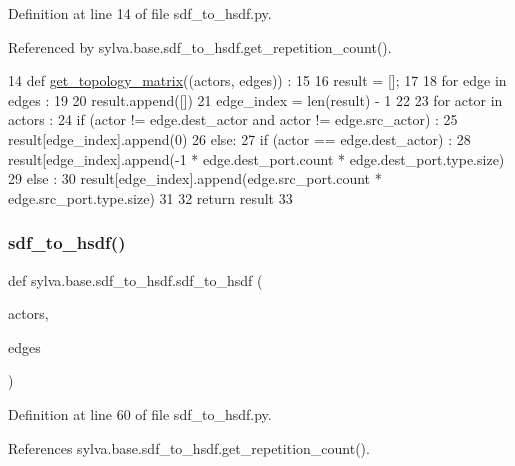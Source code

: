 Definition at line 14 of file sdf\+\_\+to\+\_\+hsdf.\+py.



Referenced by sylva.\+base.\+sdf\+\_\+to\+\_\+hsdf.\+get\+\_\+repetition\+\_\+count().


\begin{DoxyCode}
14 \textcolor{keyword}{def }\hyperlink{namespacesylva_1_1base_1_1sdf__to__hsdf_a947a1ab376b5ba3021f86fba7fcb17aa}{get\_topology\_matrix}((actors, edges)) :
15 
16   result = [];
17 
18   \textcolor{keywordflow}{for} edge \textcolor{keywordflow}{in} edges :
19 
20     result.append([])
21     edge\_index = len(result) - 1
22 
23     \textcolor{keywordflow}{for} actor \textcolor{keywordflow}{in} actors :
24       \textcolor{keywordflow}{if} (actor != edge.dest\_actor \textcolor{keywordflow}{and} actor != edge.src\_actor) :
25         result[edge\_index].append(0)
26       \textcolor{keywordflow}{else}:
27         \textcolor{keywordflow}{if} (actor == edge.dest\_actor) :
28           result[edge\_index].append(-1 * edge.dest\_port.count * edge.dest\_port.type.size)
29         \textcolor{keywordflow}{else} :
30           result[edge\_index].append(edge.src\_port.count * edge.src\_port.type.size)
31 
32   \textcolor{keywordflow}{return} result
33 
\end{DoxyCode}
\mbox{\label{namespacesylva_1_1base_1_1sdf__to__hsdf_a41dda1a461cf7b083fbd682fc94d5e10}} 
\subsubsection{\texorpdfstring{sdf\+\_\+to\+\_\+hsdf()}{sdf\_to\_hsdf()}}
{\footnotesize\ttfamily def sylva.\+base.\+sdf\+\_\+to\+\_\+hsdf.\+sdf\+\_\+to\+\_\+hsdf (\begin{DoxyParamCaption}\item[{}]{actors,  }\item[{}]{edges }\end{DoxyParamCaption})}



Definition at line 60 of file sdf\+\_\+to\+\_\+hsdf.\+py.



References sylva.\+base.\+sdf\+\_\+to\+\_\+hsdf.\+get\+\_\+repetition\+\_\+count().



